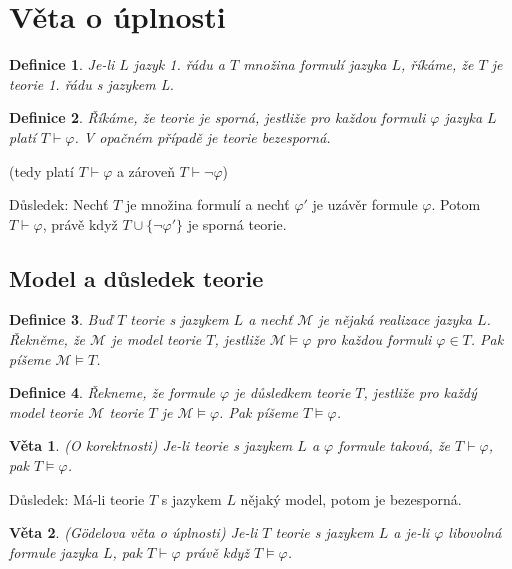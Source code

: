 \documentclass[a4paper, 11pt]{report}
\newtheorem{mydef}{Definice}[chapter]
\newtheorem{veta}{Věta}
\begin{document}
\section{Věta o úplnosti}

\begin{mydef}
Je-li $L$ jazyk 1. řádu a $T$ množina formulí jazyka $L$, říkáme, že $T$ je \emph{teorie 1. řádu} s jazykem L.
\end{mydef}

\begin{mydef}
Říkáme, že teorie je \emph{sporná}, jestliže pro každou formuli $\varphi$ jazyka $L$ platí $T \vdash \varphi$. V opačném případě je teorie \emph{bezesporná}.
\end{mydef}
(tedy platí $T \vdash \varphi$ a zároveň $T \vdash \lnot \varphi$)

Důsledek: Nechť $T$ je množina formulí a nechť $\varphi'$ je uzávěr formule $\varphi$. Potom $T \vdash \varphi$, právě když $T \cup \{\lnot \varphi'\}$ je sporná teorie.

\subsection{Model a důsledek teorie}

\begin{mydef}
Buď $T$ teorie s jazykem $L$ a nechť $\mathcal{M}$ je nějaká realizace jazyka $L$. Řekněme, že $\mathcal{M}$ je model teorie $T$, jestliže $\mathcal{M} \models \varphi$ pro každou formuli $\varphi \in T$. Pak píšeme $\mathcal{M} \models T$.
\end{mydef}

\begin{mydef}
Řekneme, že formule $\varphi$ je \emph{důsledkem teorie $T$}, jestliže pro každý model teorie $\mathcal{M}$ teorie $T$ je $\mathcal{M} \models \varphi$. Pak píšeme $T \models \varphi$.
\end{mydef}

\begin{veta}
(O korektnosti) Je-li teorie s jazykem $L$ a $\varphi$ formule taková, že $T \vdash \varphi$, pak $T \models \varphi$.
\end{veta}

Důsledek: Má-li teorie $T$ s jazykem $L$ nějaký model, potom je bezesporná.

\begin{veta}
(Gödelova věta o úplnosti) Je-li $T$ teorie s jazykem $L$ a je-li $\varphi$ libovolná formule jazyka $L$, pak $T \vdash \varphi$ právě když $T \models \varphi$.
\end{veta}
\end{document}
